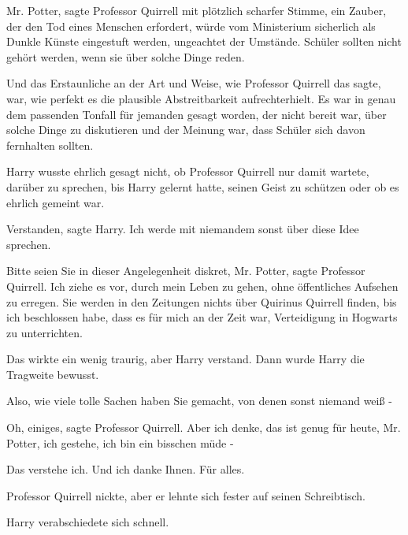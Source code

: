 \glqq Mr. Potter\grqq{}, sagte Professor Quirrell mit plötzlich scharfer
Stimme, \glqq ein Zauber, der den Tod eines Menschen erfordert, würde vom
Ministerium sicherlich als Dunkle Künste eingestuft werden, ungeachtet der
Umstände. Schüler sollten nicht gehört werden, wenn sie über solche Dinge
reden.\grqq{}

Und das Erstaunliche an der Art und Weise, wie Professor Quirrell das sagte,
war, wie perfekt es die plausible Abstreitbarkeit aufrechterhielt. Es war in
genau dem passenden Tonfall für jemanden gesagt worden, der nicht bereit war,
über solche Dinge zu diskutieren und der Meinung war, dass Schüler sich davon
fernhalten sollten.

Harry wusste ehrlich gesagt nicht, ob Professor Quirrell nur damit wartete,
darüber zu sprechen, bis Harry gelernt hatte, seinen Geist zu schützen oder ob
es ehrlich gemeint war.

\glqq Verstanden\grqq{}, sagte Harry. \glqq Ich werde mit niemandem sonst über
diese Idee sprechen.\grqq{}

\glqq Bitte seien Sie in dieser Angelegenheit diskret, Mr. Potter\grqq{}, sagte
Professor Quirrell. \glqq Ich ziehe es vor, durch mein Leben zu gehen, ohne
öffentliches Aufsehen zu erregen. Sie werden in den Zeitungen nichts über
Quirinus Quirrell finden, bis ich beschlossen habe, dass es für mich an der Zeit
war, Verteidigung in Hogwarts zu unterrichten.\grqq{}

Das wirkte ein wenig traurig, aber Harry verstand. Dann wurde Harry die
Tragweite bewusst.

\glqq Also, wie viele tolle Sachen haben Sie gemacht, von denen sonst niemand
weiß -\grqq{}

\glqq Oh, einiges\grqq{}, sagte Professor Quirrell. \glqq Aber ich denke, das
ist genug für heute, Mr. Potter, ich gestehe, ich bin ein bisschen müde -\grqq{}

\glqq Das verstehe ich. Und ich danke Ihnen. Für alles.\grqq{}

Professor Quirrell nickte, aber er lehnte sich fester auf seinen Schreibtisch.

Harry verabschiedete sich schnell.
